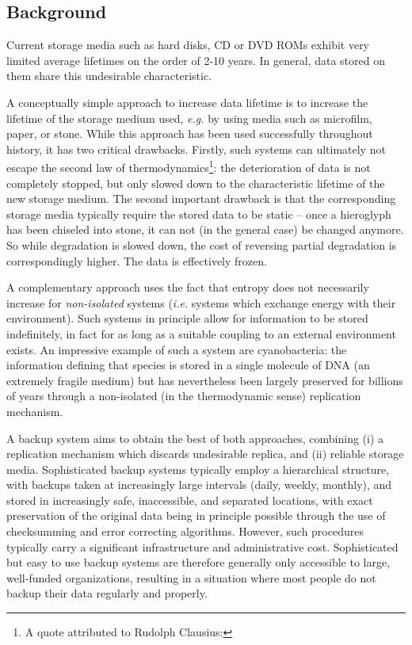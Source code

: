 \documentclass[11pt]{article}
\begin{document}
\begin{mainmatter}

\section{Background}

Current storage media such as hard disks, CD or DVD ROMs exhibit very limited average lifetimes on the order of 2-10 years. In general, data stored on them share this undesirable characteristic. 

A conceptually simple approach to increase data lifetime is to increase the lifetime of the storage medium used, \emph{e.g.} by using media such as microfilm, paper, or stone. While this approach has been used successfully throughout history, it has two critical drawbacks.
Firstly, such systems can ultimately not escape the second law of thermodynamics\footnote{
A quote attributed to Rudolph Clausius:
}: the deterioration of data is not completely stopped, but only slowed down to the characteristic lifetime of the new storage medium. The second important drawback is that the corresponding storage media typically require the stored data to be static -- once a hieroglyph has been chiseled into stone, it can not (in the general case) be changed anymore. So while degradation is slowed down, the cost of reversing partial degradation is correspondingly higher. The data is effectively frozen.

A complementary approach uses the fact that entropy does not necessarily increase for \emph{non-isolated} systems (\emph{i.e.} systems which exchange energy with their environment). Such systems in principle allow for information to be stored indefinitely, in fact for as long as a suitable coupling to an external environment exists.  An impressive example of such a system are cyanobacteria: the information defining that species is stored in a single molecule of DNA (an extremely fragile medium) but has nevertheless been largely preserved for billions of years through a non-isolated (in the thermodynamic sense) replication mechanism.

A backup system aims to obtain the best of both approaches, combining (i) a replication mechanism which discards undesirable replica, and (ii) reliable storage media. Sophisticated backup systems typically employ a hierarchical structure, with backups taken at increasingly large intervals (daily, weekly, monthly), and stored in increasingly safe, inaccessible, and separated locations, with exact preservation of the original data being in principle possible through the use of checksumming and error correcting algorithms. However, such procedures typically carry a significant infrastructure and administrative cost. Sophisticated but easy to use backup systems are therefore generally only accessible to large, well-funded organizations, resulting in a situation where most people do not backup their data regularly and properly.


\end{mainmatter}
\end{document}
